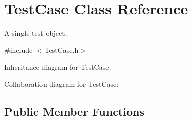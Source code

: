 \hypertarget{class_test_case}{\section{Test\+Case Class Reference}
\label{class_test_case}
}


A single test object.  




{\ttfamily \#include $<$Test\+Case.\+h$>$}



Inheritance diagram for Test\+Case\+:


Collaboration diagram for Test\+Case\+:
\subsection*{Public Member Functions}
